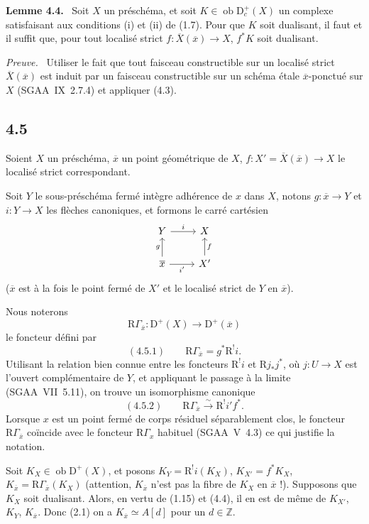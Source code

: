 \documentclass[11pt]{article}
\newenvironment{statement}[1]{\par\medskip\noindent\textbf{#1.}\ }{\par\medskip}
\newenvironment{prooftext}[1][Proof]{\par\noindent\emph{#1.}\ }{\par\medskip}
\newcommand{\R}{\mathrm{R}}
\newcommand{\D}{\mathrm{D}}
\newcommand{\Z}{\mathbb{Z}}
\newcommand{\ob}{\operatorname{ob}}
\newcommand{\ol}[1]{\overline{#1}}
\providecommand{\ob}{\operatorname{ob}}
\providecommand{\R}{\mathrm R}
\providecommand{\Z}{\mathbb Z}
\begin{document}
\begin{statement}{Lemme 4.4}
Soit $X$ un préschéma, et soit $K\in\ob\D_c^+(X)$ un complexe satisfaisant aux conditions (i) et (ii) de (1.7). Pour que $K$ soit dualisant, il faut et il suffit que, pour tout localisé strict $f:\ol{X}(\ol{x})\to X$, $f^*K$ soit dualisant.
\end{statement}

\begin{prooftext}[Preuve]
Utiliser le fait que tout faisceau constructible sur un localisé strict $\ol{X}(\ol{x})$ est induit par un faisceau constructible sur un schéma étale $\ol{x}$-ponctué sur $X$ (SGAA~IX~2.7.4) et appliquer (4.3).
\end{prooftext}

\subsection*{4.5}
Soient $X$ un préschéma, $\ol{x}$ un point géométrique de $X$, $f:X'=\ol{X}(\ol{x})\to X$ le localisé strict correspondant.

Soit $Y$ le sous-préschéma fermé intègre adhérence de $x$ dans $X$, notons $g:\ol{x}\to Y$ et $i:Y\to X$ les flèches canoniques, et formons le carré cartésien
\[
\begin{tikzcd}
Y \arrow[r,"i"] & X \\
\ol{x} \arrow[u,"g"] \arrow[r,"i'"'] & X' \arrow[u,"f"']
\end{tikzcd}
\]
($\ol{x}$ est à la fois le point fermé de $X'$ et le localisé strict de $Y$ en $\ol{x}$).

Nous noterons
\[
\R\Gamma_{\ol{x}}:\D^+(X)\longrightarrow \D^+(\ol{x})
\]
le foncteur défini par
\[
(4.5.1)\qquad \R\Gamma_{\ol{x}}=g^*\R^{!}i.
\]
Utilisant la relation bien connue entre les foncteurs $\R^{!}i$ et $\R j_*j^*$, où $j:U\to X$ est l'ouvert complémentaire de $Y$, et appliquant le passage à la limite (SGAA~VII~5.11), on trouve un isomorphisme canonique
\[
(4.5.2)\qquad \R\Gamma_{\ol{x}}\xrightarrow{\sim}\R^{!}i' f^*.
\]
Lorsque $x$ est un point fermé de corps résiduel séparablement clos, le foncteur $\R\Gamma_{\ol{x}}$ coïncide avec le foncteur $\R\Gamma_x$ habituel (SGAA~V~4.3) ce qui justifie la notation.

Soit $K_X\in\ob\D^+(X)$, et posons $K_Y=\R^{!}i(K_X)$, $K_{X'}=f^*K_X$, $K_{\ol{x}}=\R\Gamma_{\ol{x}}(K_X)$ (attention, $K_{\ol{x}}$ n'est pas la fibre de $K_X$ en $\ol{x}$ !). Supposons que $K_X$ soit dualisant. Alors, en vertu de (1.15) et (4.4), il en est de même de $K_{X'}$, $K_Y$, $K_{\ol{x}}$. Donc (2.1) on a $K_{\ol{x}}\simeq A[d]$ pour un $d\in\Z$.
\end{document}
